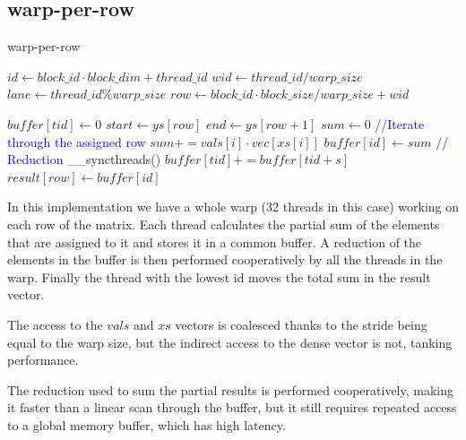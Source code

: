 \documentclass[conference]{IEEEtran}
\begin{document}
\subsection{warp-per-row}
\begin{algorithm}[ht!]
    \caption{warp-per-row}
    \begin{algorithmic}[1]
        \State $id \gets block\_id \cdot block\_dim + thread\_id$
        \State $wid \gets thread\_id / warp\_size$
        \State $lane \gets thread\_id \% warp\_size$
        \State $row \gets block\_id \cdot block\_size / warp\_size + wid$

        \State $buffer[tid] \gets 0$ \Comment{\textcolor{blue}{Always initiated to $0$ for safety}}
        \State $start \gets ys[row]$
        \State $end\gets ys[row+1]$
        \State $sum \gets 0$
        \State \textcolor{blue}{//Iterate through the assigned row}
        \State $sum += vals[i]\cdot vec[xs[i]]$
        \EndFor
        \State $buffer[id] \gets sum$
        \EndIf
        \State \textcolor{blue}{// Reduction}
        \State \_\_syncthreads()
        \State $buffer[tid] += buffer[tid+s]$
        \EndIf
        \EndFor
        \State $result[row] \gets buffer[id]$
        \EndIf
        \EndProcedure
    \end{algorithmic}
    \label{algo:warprow}
\end{algorithm}
In this implementation we have a whole warp (32 threads in this case) working on each row of the matrix. Each thread calculates the partial sum of the elements that are assigned to it and stores it in a common buffer. A reduction of the elements in the buffer is then performed cooperatively by all the threads in the warp. Finally the thread with the lowest id moves the total sum in the result vector.

The access to the $vals$ and $xs$ vectors is coalesced thanks to the stride being equal to the warp size, but the indirect access to the dense vector is not, tanking performance.

The reduction used to sum the partial results is performed cooperatively, making it faster than a linear scan through the buffer, but it still requires repeated access to a global memory buffer, which has high latency.
\end{document}
